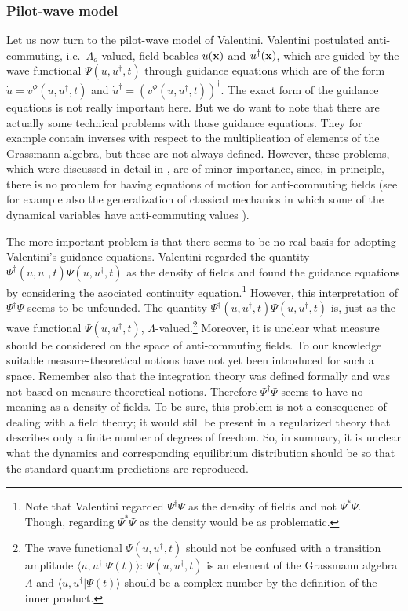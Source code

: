 \documentclass[12pt]{article}
\begin{document}
\subsubsection{Pilot-wave model}\label{pwmgrassmann}
Let us now turn to the pilot-wave model of Valentini. Valentini postulated anti-com\-mu\-ting, i.e.\ $\Lambda_o$-valued, field beables $u({\bf x})$ and $u^{\dagger}({\bf x})$, which are guided by the wave functional $\Psi(u,u^\dagger,t)$ through guidance equations which are of the form ${\dot u} = v^{\Psi}(u,u^\dagger,t)$ and ${\dot u}^\dagger = (v^{\Psi}(u,u^\dagger,t))^\dagger$. The exact form of the guidance equations is not really important here. But we do want to note that there are actually some technical problems with those guidance equations. They for example contain inverses with respect to the multiplication of elements of the Grassmann algebra, but these are not always defined. However, these problems, which were discussed in detail in \cite{struyve05}, are of minor importance, since, in principle, there is no problem for having equations of motion for anti-commuting fields (see for example also the generalization of classical mechanics in which some of the dynamical variables have anti-commuting values \cite{martin59,berezin77,casalbuoni761,casalbuoni762}). 

The more important problem is that there seems to be no real basis for adopting Valentini's guidance equations. Valentini regarded the quantity $\Psi^\dagger(u,u^\dagger,t) \Psi(u,u^\dagger,t)$ as the density of fields and found the guidance equations by considering the asociated continuity equation.{\footnote{Note that Valentini regarded $\Psi^\dagger \Psi$ as the density of fields and not $\Psi^* \Psi$. Though, regarding $\Psi^*\Psi$ as the density would be as problematic.}} However, this interpretation of $\Psi^\dagger \Psi$ seems to be unfounded. The quantity $\Psi^\dagger(u,u^\dagger,t) \Psi(u,u^\dagger,t)$ is, just as the wave functional $\Psi(u,u^\dagger,t)$, $\Lambda$-valued.{\footnote{The wave functional $\Psi(u,u^\dagger,t)$ should not be confused with a transition amplitude $\langle u,u^\dagger | \Psi(t) \rangle$: $\Psi(u,u^\dagger,t)$ is an element of the Grassmann algebra $\Lambda$ and $\langle u,u^\dagger | \Psi(t) \rangle$ should be a complex number by the definition of the inner product.}} Moreover, it is unclear what measure should be considered on the space of anti-commuting fields. To our knowledge suitable measure-theoretical notions have not yet been introduced for such a space. Remember also that the integration theory was defined formally and was not based on measure-theoretical notions. Therefore $\Psi^\dagger \Psi$ seems to have no meaning as a density of fields. To be sure, this problem is not a consequence of dealing with a field theory; it would still be present in a regularized theory that describes only a finite number of degrees of freedom. So, in summary, it is unclear what the dynamics and corresponding equilibrium distribution should be so that the standard quantum predictions are reproduced.
\end{document}
